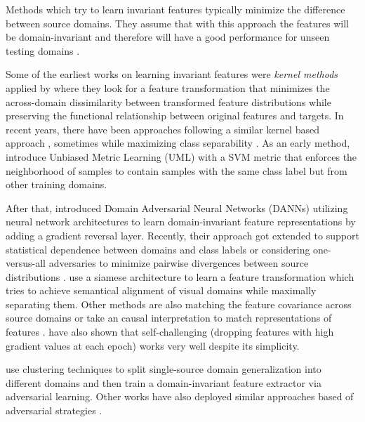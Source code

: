 Methods which try to learn invariant features typically minimize the difference between source domains. They assume that with this approach the features will be domain-invariant and therefore will have a good performance for unseen testing domains \citep{huang2020selfchallenging}.

Some of the earliest works on learning invariant features were \emph{kernel methods} applied by \citet{MuandetBS13}  where they look for a feature transformation that minimizes the across-domain dissimilarity between transformed feature distributions while preserving the functional relationship between original features and targets. In recent years, there have been approaches following a similar kernel based approach \citep{LiGTLT18, LiTGLLZT18}, sometimes while maximizing class separability \citep{Hu0CC19, GhifaryBKZ17}. As an early method, \citet{FangXR13} introduce Unbiased Metric Learning (UML) with a SVM metric that enforces the neighborhood of samples to contain samples with the same class label but from other training domains.

After that, \citet{GaninUAGLLML16} introduced Domain Adversarial Neural Networks (DANNs) utilizing neural network architectures to learn domain-invariant feature representations by adding a gradient reversal layer. Recently, their approach got extended to support statistical dependence between domains and class labels \citep{AkuzawaIM19} or considering one-versus-all adversaries to minimize pairwise divergences between source distributions \citep{albuquerque2019generalizing}. \citet{MotiianPAD17} use a siamese architecture to learn a feature transformation which tries to achieve semantical alignment of visual domains while maximally separating them. Other methods are also matching the feature covariance across source domains \citep{RahmanFBS20} or take an causal interpretation to match representations of features \citep{mahajan2020domain}. \citet{huang2020selfchallenging} have also shown that self-challenging (\ie dropping features with high gradient values at each epoch) works very well despite its simplicity. 

\citet{MatsuuraH20} use clustering techniques to split single-source domain generalization into different domains and then train a domain-invariant feature extractor via adversarial
learning. Other works have also deployed similar approaches based of adversarial strategies \citep{deng2020representation, Jia_2020_CVPR_SSDG}.

